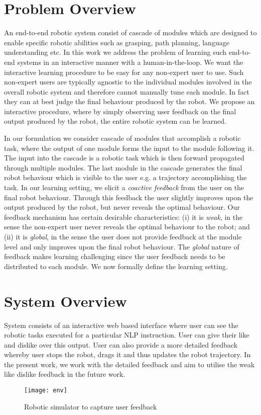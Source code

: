 \section{Problem Overview}

An end-to-end robotic system consist of cascade of modules which are designed to enable specific robotic abilities such as grasping, path planning, language understanding etc. In this
work we address the problem of learning such end-to-end systems in an interactive manner with a human-in-the-loop. We want the interactive learning procedure to be easy for any non-expert user to use. Such non-expert users are typically agnostic to the individual modules involved in the overall robotic system and therefore cannot manually tune each module. In fact they can at best judge the final behaviour produced by the robot. We propose an interactive procedure, where by simply observing user feedback on the final output produced by the robot, the entire robotic system can be learned.

In our formulation we consider cascade of modules that accomplish a robotic task, where the output of one module forms the input to the module following it. The input into the cascade is a robotic task which is then forward propagated through multiple modules. The last module in the cascade generates the final robot behaviour which is visible to the user e.g. a trajectory accomplishing the task. In our learning setting, we elicit a \textit{coactive feedback} from the user on the final robot behaviour. Through this feedback the user slightly improves upon the output produced by the robot, but never reveals the optimal behaviour. Our feedback mechanism has certain desirable characteristics: (i) it is \textit{weak}, in the sense the non-expert user never reveals the optimal behaviour to the robot; and (ii) it is \textit{global}, in the sense the user does not provide feedback at the module level and only improves upon the final robot behaviour. The \textit{global} nature of feedback makes learning challenging since the user feedback needs to be distributed to each module. We now formally define the learning setting.

\section{System Overview}
System consists of an interactive web based interface where user can see the robotic tasks
executed for a particular NLP instruction. User can give their like and dislike
over this output. User can also provide a more detailed feedback whereby user stops the robot, drags it and thus updates the robot trajectory. In the present work, we work with the detailed feedback and aim to utilise the weak like dislike feedback in the future work.

\begin{figure}[h]
\texttt{[image: env]}
\centering
\caption{Robotic simulator to capture user feedback}
	\label{fig:env}
\end{figure}

